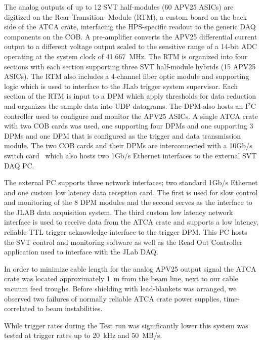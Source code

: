 \documentclass[final,3p,times,twocolumn]{elsarticle}
\begin{document}
The analog outputs of up to 12 SVT half-modules (60 APV25 ASICs) are digitized on the Rear-Transition-
Module (RTM), a custom board 
on the back side of the ATCA crate, interfacing the HPS-specific readout to the generic DAQ components 
on the 
COB. A pre-amplifier converts the APV25 differential current output to a different voltage output scaled to 
the sensitive range of a 14-bit ADC operating at the system clock of 41.667~MHz. The RTM is organized 
into four sections with each section supporting three SVT half-module hybrids (15 APV25 ASICs). The 
RTM also includes a 4-channel fiber optic module and supporting logic which is used to interface 
to the JLab trigger system supervisor. Each section of the RTM is input to a DPM which apply thresholds 
for data reduction and organizes the sample data into UDP datagrams. The DPM also hosts an I$^{2}$C 
controller used to configure and monitor the APV25 ASICs. A single ATCA crate with two COB cards 
was used, one supporting four DPMs and one supporting 3 DPMs and one DPM that is configured as 
the trigger and data transmission module. The two COB cards and their DPMs are interconnected with a 
10Gb/s switch card~\cite{Larsen:2011zb} which also hosts two 1Gb/s Ethernet interfaces to the external 
SVT DAQ PC.  

The external PC supports three network interfaces; two standard 1Gb/s Ethernet and one custom low 
latency data reception card. The first is used for slow control and monitoring of the 8 
DPM modules and the second serves as the interface to the JLAB data acquisition system. The third 
custom low latency network interface is used to receive data from the ATCA crate and supports a low 
latency, reliable TTL trigger acknowledge interface to the trigger DPM. This PC hosts the SVT control 
and monitoring software as well as the Read Out Controller application used to interface with the 
JLab DAQ.

In order to minimize cable length for the analog APV25 output signal the ATCA crate was located 
approximately 1~m from the beam line, next to our cable vacuum feed troughs.   
Before shielding with lead-blankets was arranged, we observed two failures of normally reliable ATCA 
crate power supplies, time-correlated to beam instabilities. 

While trigger rates during the Test run was significantly lower this system was tested at trigger rates up 
to 20~kHz and 50~MB/s. 
\end{document}

